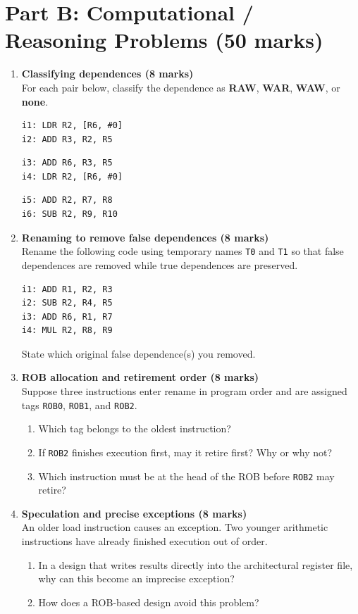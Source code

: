 \documentclass[11pt]{article}
\begin{document}
\section*{Part B: Computational / Reasoning Problems (50 marks)}
\begin{enumerate}[label=\textbf{B\arabic*.}]
  \item \textbf{Classifying dependences (8 marks)}\\
  For each pair below, classify the dependence as \textbf{RAW}, \textbf{WAR}, \textbf{WAW}, or \textbf{none}.
\begin{verbatim}
i1: LDR R2, [R6, #0]
i2: ADD R3, R2, R5
\end{verbatim}
\begin{verbatim}
i3: ADD R6, R3, R5
i4: LDR R2, [R6, #0]
\end{verbatim}
\begin{verbatim}
i5: ADD R2, R7, R8
i6: SUB R2, R9, R10
\end{verbatim}

  \item \textbf{Renaming to remove false dependences (8 marks)}\\
  Rename the following code using temporary names \texttt{T0} and \texttt{T1} so that false dependences are removed while true dependences are preserved.
\begin{verbatim}
i1: ADD R1, R2, R3
i2: SUB R2, R4, R5
i3: ADD R6, R1, R7
i4: MUL R2, R8, R9
\end{verbatim}
  State which original false dependence(s) you removed.

  \item \textbf{ROB allocation and retirement order (8 marks)}\\
  Suppose three instructions enter rename in program order and are assigned tags \texttt{ROB0}, \texttt{ROB1}, and \texttt{ROB2}.
  \begin{enumerate}[label=(\alph*)]
    \item Which tag belongs to the oldest instruction?
    \item If \texttt{ROB2} finishes execution first, may it retire first? Why or why not?
    \item Which instruction must be at the head of the ROB before \texttt{ROB2} may retire?
  \end{enumerate}

  \item \textbf{Speculation and precise exceptions (8 marks)}\\
  An older load instruction causes an exception. Two younger arithmetic instructions have already finished execution out of order.
  \begin{enumerate}[label=(\alph*)]
    \item In a design that writes results directly into the architectural register file, why can this become an imprecise exception?
    \item How does a ROB-based design avoid this problem?
  \end{enumerate}


\end{enumerate}
\end{document}
